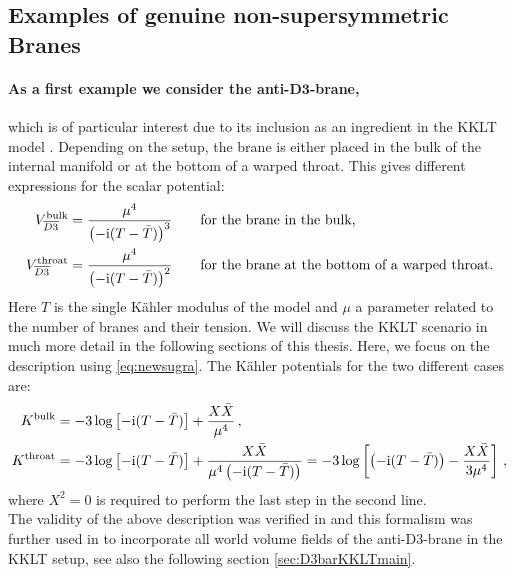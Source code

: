 \documentclass[a4paper,12pt]{report}
\newcommand{\bea}{\begin{equation}\begin{aligned}}
\newcommand{\eea}{\end{aligned}\end{equation}}
\def\rmi{{\rm i}}
\begin{document}
\subsection{Examples of genuine non-supersymmetric Branes}
\paragraph{As a first example we consider the anti-$\mathbf{D3}$-brane,} which is of particular interest due to its inclusion as an ingredient in the KKLT model \cite{Kachru:2003aw,Kachru:2003sx}. Depending on the setup, the brane is either placed in the bulk of the internal manifold or at the bottom of a warped throat. This gives different expressions for the scalar potential:
\bea 
V^{\text{bulk}}_{\overline{D3}} &= \frac{\mu^4}{\left(-\rmi(T-\bar{T})\right)^3}\qquad \text{for the brane in the bulk,}\\
V^{\text{throat}}_{\overline{D3}} &= \frac{\mu^4}{\left(-\rmi(T-\bar{T})\right)^2}\qquad \text{for the brane at the bottom of a warped throat.}
\eea
Here $T$ is the single Kähler modulus of the model and $\mu$ a parameter related to the number of branes and their tension. We will discuss the KKLT scenario in much more detail in the following sections of this thesis. Here, we focus on the description using \eqref{eq:newsugra}. The Kähler potentials for the two different cases are:
\bea 
K^{\text{bulk}} &= -3 \log \left[ -\rmi(T-\bar{T})\right] + \frac{X \bar{X}}{\mu^4}\,,\\
K^{\text{throat}} &= -3 \log \left[-\rmi (T-\bar{T})\right] + \frac{X\bar{X}}{\mu^4\left(-\rmi (T-\bar{T})\right)} = - 3 \log \left[ \left(-\rmi (T-\bar{T})\right) - \frac{X\bar{X}}{3\mu^4} \right]\,,
\eea
where $X^2=0$ is required to perform the last step in the second line.\\
The validity of the above description was verified in \cite{Kallosh:2014wsa,Bergshoeff:2015jxa} and this formalism was further used in \cite{GarciadelMoral:2017vnz,Cribiori:2019hod} to incorporate all world volume fields of the anti-D3-brane in the KKLT setup, see also the following section \ref{sec:D3barKKLTmain}.
\end{document}
